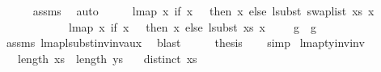 \begin{isabellebody}
\ \ \ \ \isamarkupfalse%
\ assms{\isacharparenleft}{\kern0pt}{}{\isacharparenright}{\kern0pt}\ \isamarkupfalse%
\ auto\isanewline
\ \ \isamarkupfalse%
\ \isamarkupfalse%
\ {\isachardoublequoteopen}lmap\ {\isacharparenleft}{\kern0pt}{\isasymlambda}x{\isachardot}{\kern0pt}\ if\ x\ {\isacharless}{\kern0pt}\ {}\ then\ x\ else\ {\isacharparenleft}{\kern0pt}lsubst\ {\isacharparenleft}{\kern0pt}swap{\isacharunderscore}{\kern0pt}list\ xs{\isacharparenright}{\kern0pt}\ {\isacharparenleft}{\kern0pt}x\ {\isacharminus}{\kern0pt}\ {}{\isacharparenright}{\kern0pt}\ {\isacharplus}{\kern0pt}\ {}{\isacharparenright}{\kern0pt}{\isacharparenright}{\kern0pt}\isanewline
\ \ \ \ \ \ \ \ \ \ \ \ {\isacharparenleft}{\kern0pt}lmap\ {\isacharparenleft}{\kern0pt}{\isasymlambda}x{\isachardot}{\kern0pt}\ if\ x\ {\isacharless}{\kern0pt}\ {}\ then\ x\ else\ {\isacharparenleft}{\kern0pt}lsubst\ xs\ {\isacharparenleft}{\kern0pt}x\ {\isacharminus}{\kern0pt}\ {}{\isacharparenright}{\kern0pt}\ {\isacharplus}{\kern0pt}\ {}{\isacharparenright}{\kern0pt}{\isacharparenright}{\kern0pt}\ g{\isacharparenright}{\kern0pt}\ {\isacharequal}{\kern0pt}\ g{\isachardoublequoteclose}\isanewline
\ \ \ \ \isamarkupfalse%
\ assms{\isacharparenleft}{\kern0pt}{}{\isacharcomma}{\kern0pt}{}{\isacharparenright}{\kern0pt}\ lmap{\isacharunderscore}{\kern0pt}lsubst{\isacharunderscore}{\kern0pt}inv{\isacharunderscore}{\kern0pt}inv{\isacharunderscore}{\kern0pt}aux{}\ \isamarkupfalse%
\ blast\isanewline
\ \ \isamarkupfalse%
\ \isamarkupfalse%
\ {\isacharquery}{\kern0pt}thesis\isanewline
\ \ \isamarkupfalse%
\ simp\isanewline
{}\isamarkupfalse%
%
\endisatagproof
{\isafoldproof}%
%
\isadelimproof
%
\endisadelimproof
%
\isadelimdocument
%
\endisadelimdocument
%
\isatagdocument
%
\isamarkuptrue%
%
\endisatagdocument
{\isafolddocument}%
%
\isadelimdocument
%
\endisadelimdocument
{}\isamarkupfalse%
\ lmap{\isacharunderscore}{\kern0pt}ty{\isacharunderscore}{\kern0pt}inv{\isacharunderscore}{\kern0pt}inv{\isacharcolon}{\kern0pt}\isanewline
\ \ \ {\isachardoublequoteopen}length\ xs\ {\isacharequal}{\kern0pt}\ length\ ys{\isachardoublequoteclose}\isanewline
\ \ \ {\isachardoublequoteopen}distinct\ xs{\isachardoublequoteclose}\isanewline

\end{isabellebody}
